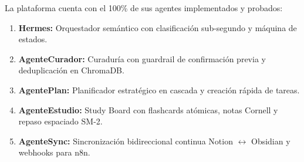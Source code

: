 \documentclass[11pt,a4paper]{article}
\begin{document}
La plataforma cuenta con el 100\% de sus agentes implementados y probados:
\begin{enumerate}[leftmargin=1.2cm]
  \item \textbf{Hermes:} Orquestador semántico con clasificación sub-segundo y máquina de estados.
  \item \textbf{AgenteCurador:} Curaduría con guardrail de confirmación previa y deduplicación en ChromaDB.
  \item \textbf{AgentePlan:} Planificador estratégico en cascada y creación rápida de tareas.
  \item \textbf{AgenteEstudio:} Study Board con flashcards atómicas, notas Cornell y repaso espaciado SM-2.
  \item \textbf{AgenteSync:} Sincronización bidireccional continua Notion $\leftrightarrow$ Obsidian y webhooks para n8n.
\end{enumerate}
\end{document}

